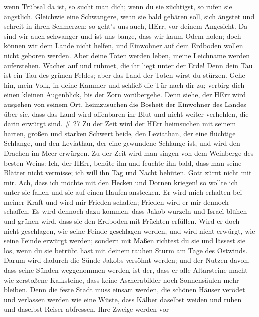 wenn Trübsal da ist, so sucht man dich; wenn du sie züchtigst, so rufen
sie ängstlich.  Gleichwie eine Schwangere, wenn sie bald
gebären soll, sich ängstet und schreit in ihren Schmerzen: so geht's uns
auch, HErr, vor deinem Angesicht.  Da sind wir auch
schwanger und ist uns bange, dass wir kaum Odem holen; doch können wir
dem Lande nicht helfen, und Einwohner auf dem Erdboden wollen nicht
geboren werden.  Aber deine Toten werden leben, meine
Leichname werden auferstehen. Wachet auf und rühmet, die ihr liegt unter
der Erde! Denn dein Tau ist ein Tau des grünen Feldes; aber das Land der
Toten wirst du stürzen.  Gehe hin, mein Volk, in deine
Kammer und schließ die Tür nach dir zu; verbirg dich einen kleinen
Augenblick, bis der Zorn vorübergehe.  Denn siehe, der HErr
wird ausgehen von seinem Ort, heimzusuchen die Bosheit der Einwohner des
Landes über sie, dass das Land wird offenbaren ihr Blut und nicht weiter
verhehlen, die darin erwürgt sind. \# 27  Zu der Zeit wird
der HErr heimsuchen mit seinem harten, großen und starken Schwert beide,
den Leviathan, der eine flüchtige Schlange, und den Leviathan, der eine
gewundene Schlange ist, und wird den Drachen im Meer erwürgen.
 Zu der Zeit wird man singen von dem Weinberge des besten
Weins:  Ich, der HErr, behüte ihn und feuchte ihn bald, dass
man seine Blätter nicht vermisse; ich will ihn Tag und Nacht behüten.
 Gott zürnt nicht mit mir. Ach, dass ich möchte mit den
Hecken und Dornen kriegen! so wollte ich unter sie fallen und sie auf
einen Haufen anstecken.  Er wird mich erhalten bei meiner
Kraft und wird mir Frieden schaffen; Frieden wird er mir dennoch
schaffen.  Es wird dennoch dazu kommen, dass Jakob wurzeln
und Israel blühen und grünen wird, dass sie den Erdboden mit Früchten
erfüllen.  Wird er doch nicht geschlagen, wie seine Feinde
geschlagen werden, und wird nicht erwürgt, wie seine Feinde erwürgt
werden;  sondern mit Maßen richtest du sie und lässest sie
los, wenn du sie betrübt hast mit deinem rauhen Sturm am Tage des
Ostwinds.  Darum wird dadurch die Sünde Jakobs versöhnt
werden; und der Nutzen davon, dass seine Sünden weggenommen werden, ist
der, dass er alle Altarsteine macht wie zerstoßene Kalksteine, dass
keine Ascherabilder noch Sonnensäulen mehr bleiben.  Denn
die feste Stadt muss einsam werden, die schönen Häuser verödet und
verlassen werden wie eine Wüste, dass Kälber daselbst weiden und ruhen
und daselbst Reiser abfressen.  Ihre Zweige werden vor

